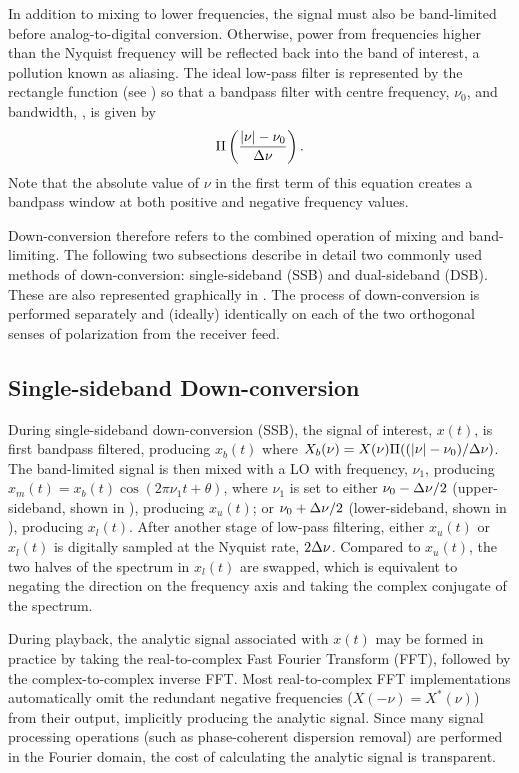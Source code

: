 In addition to mixing to lower frequencies, the signal must also be band-limited before analog-to-digital conversion.  Otherwise, power from frequencies higher than the Nyquist frequency will be reflected back into the band of interest, a pollution known as aliasing.  
%
The ideal low-pass filter is represented by the rectangle function (see ) so that a bandpass filter with centre frequency, $\nu_0$, and bandwidth, \bw, is given by
\begin{equation}
\Pi \left( \frac{|\nu|-\nu_0}{ \Delta\nu } \right).
\end{equation}
Note that the absolute value of $\nu$ in the first term of this equation creates a bandpass window at both positive and negative frequency values.

Down-conversion therefore refers to the combined operation of mixing and band-limiting.  The following two subsections describe in detail two commonly used methods of down-conversion: single-sideband (SSB) and
dual-sideband (DSB).  These are also represented graphically in .  The process of
down-conversion is performed separately and (ideally) identically on each of the two orthogonal senses of polarization from the receiver feed.

\subsection{Single-sideband Down-conversion}
\label{app:ssb}

During single-sideband down-conversion (SSB), the
signal of interest, $x(t)$, is first bandpass filtered, producing
$x_b(t)$ where \mbox{$X_b(\nu)=X(\nu)\Pi((|\nu|-\nu_0)/ \Delta\nu )$}.  The
band-limited signal is then mixed with a LO with frequency, $\nu_1$,
producing \mbox{$x_m(t)=x_b(t)\cos(2\pi\nu_1t+\theta)$}, where $\nu_1$ is
set to either 
$\nu_0- \Delta\nu /2$ (upper-sideband, shown in ), producing $x_u(t)$;
or
$\nu_0+ \Delta\nu /2$ (lower-sideband, shown in ), producing $x_l(t)$.
After another stage of low-pass filtering, either $x_u(t)$ or $x_l(t)$
is digitally sampled at the Nyquist rate, $2 \Delta\nu $.
%
Compared to $x_u(t)$, the two halves of the spectrum in $x_l(t)$
are swapped, which is equivalent to negating the direction on the
frequency axis and taking the complex conjugate of the spectrum.

During playback, the analytic signal associated with $x(t)$ may be
formed in practice by taking the real-to-complex Fast Fourier
Transform (FFT), followed by the complex-to-complex inverse
FFT.  Most real-to-complex FFT implementations automatically omit the
redundant negative frequencies ($X(-\nu)=X^*(\nu)$) from their output,
implicitly producing the analytic signal.
%
Since many signal processing operations
(such as phase-coherent dispersion removal)
are performed in the Fourier domain, the cost of calculating the
analytic signal is transparent.

